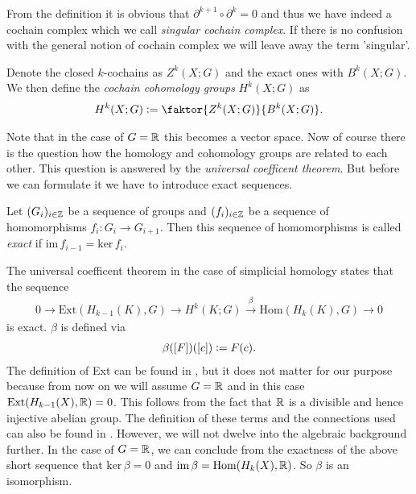 \documentclass[../master_thesis.tex]{subfiles}
\begin{document}
From the definition it is obvious that $\partial^{k+1} \circ \partial^{k} = 0$ 
and thus we have indeed a cochain complex which we call \textit{singular cochain 
complex}. If there is no confusion with the general notion of cochain complex
we will leave away the term 'singular'.
\begin{definition}
    Denote the closed $k$-cochains as $Z^k(X;G)$ and the 
    exact ones with $B^k(X;G)$. 
    We then define the \textit{cochain cohomology groups}
    $H^k(X;G)$ as
    \begin{align*}
        H^k(X;G) \vcentcolon= \faktor{Z^k(X;G)}{B^k(X;G)}.
    \end{align*}
\end{definition}
Note that in the case of $G = \mathbb{R}$ this becomes a vector space.
Now of course there is the question how the homology and cohomology groups 
are related to each other. This question is answered by the
\textit{universal coefficent theorem}. But before we can formulate it we have 
to introduce exact sequences.
\begin{definition} \label{def:exact_sequence}
    Let $(G_i)_{i\in \mathbb{Z}}$ be a sequence of groups and 
    $(f_i)_{i \in \mathbb{Z}}$ be a sequence of homomorphisms
    $f_i: G_i \rightarrow G_{i+1}$. Then this sequence of homomorphisms is
    called \textit{exact} if $\text{im}\,f_{i-1} = \text{ker}\,f_i$.
\end{definition}

The universal coefficent theorem in the case of simplicial homology states
that the sequence 
\begin{align}
    0 \rightarrow \text{Ext}(H_{k-1}(K),G) \rightarrow 
    H^k(K;G) \xrightarrow{\beta} \text{Hom}(H_k(K),G) 
    \rightarrow 0 \label{eq:univeral_coefficient_theorem}
\end{align}
is exact. 
$\beta$ is defined via 
\begin{align}
    \beta([F])([c]) \vcentcolon= F(c).
    \label{eq:isomorphism_from_universal_coefficent_theorem}
\end{align}
The definition of Ext can be found in \cite{topology_and_geometry},
but it does not matter for our purpose because from now on we will assume
$G = \mathbb{R}$ and in this case
$\text{Ext}(H_{k-1}(X),\mathbb{R}) = 0$. This follows from the fact that 
$\mathbb{R}$ is a divisible and hence injective abelian group. The definition of
these terms and the connections used can also be found in 
\cite[Sec.\,V.6]{topology_and_geometry}. However, we will not dwelve into the 
algebraic background further. In the case of $G = \mathbb{R}$, 
we can conclude from the exactness of the 
above short sequence that $\text{ker}\,\beta = 0$ and 
$\text{im}\,\beta = \text{Hom}(H_k(X),\mathbb{R})$. So $\beta$ is an isomorphism.
\end{document}
